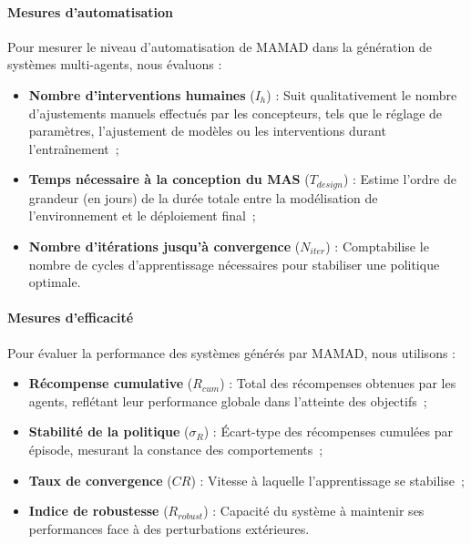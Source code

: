 \paragraph{Mesures d'automatisation}
Pour mesurer le niveau d'automatisation de MAMAD dans la génération de systèmes multi-agents, nous évaluons :
\begin{itemize}
    \item \textbf{Nombre d'interventions humaines} ($I_h$) : Suit qualitativement le nombre d'ajustements manuels effectués par les concepteurs, tels que le réglage de paramètres, l'ajustement de modèles ou les interventions durant l'entraînement~;
    \item \textbf{Temps nécessaire à la conception du MAS} ($T_{design}$) : Estime l'ordre de grandeur (en jours) de la durée totale entre la modélisation de l'environnement et le déploiement final~;
    \item \textbf{Nombre d'itérations jusqu'à convergence} ($N_{iter}$) : Comptabilise le nombre de cycles d'apprentissage nécessaires pour stabiliser une politique optimale.
\end{itemize}

\paragraph{Mesures d'efficacité}
Pour évaluer la performance des systèmes générés par MAMAD, nous utilisons :
\begin{itemize}
    \item \textbf{Récompense cumulative} ($R_{cum}$) : Total des récompenses obtenues par les agents, reflétant leur performance globale dans l'atteinte des objectifs~;
    \item \textbf{Stabilité de la politique} ($\sigma_R$) : Écart-type des récompenses cumulées par épisode, mesurant la constance des comportements~;
    \item \textbf{Taux de convergence} ($CR$) : Vitesse à laquelle l'apprentissage se stabilise~;
    \item \textbf{Indice de robustesse} ($R_{robust}$) : Capacité du système à maintenir ses performances face à des perturbations extérieures.
\end{itemize}

